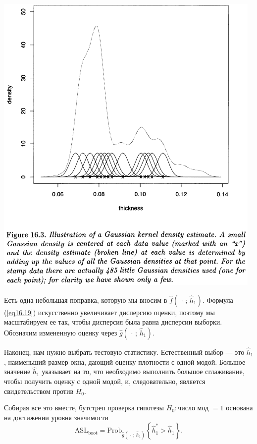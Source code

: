 \newpage
\noindent
\includegraphics[width=\linewidth]{16/f16.3.png}

Есть одна небольшая поправка, которую мы вносим в $\hat{f}(\,\cdot\,;\, \hat{h}_1)$. Формула (\ref{eq16.19}) искусственно увеличивает дисперсию оценки, поэтому мы масштабируем ее так, чтобы дисперсия была равна дисперсии выборки. Обозначим измененную оценку через $\hat{g}(\,\cdot\,;\, \hat{h}_1)$.

Наконец, нам нужно выбрать тестовую статистику. Естественный выбор --- это $ \hat{h}_1$, наименьший размер окна, дающий оценку плотности с одной модой. Большое значение $ \hat{h}_1$ указывает на то, что необходимо выполнить большое сглаживание, чтобы получить оценку с одной модой, и, следовательно, является свидетельством против $H_0$.

Собирая все это вместе, бутстреп проверка гипотезы $H_0: \text{число мод } = 1$ основана на достижении уровня значимости
\begin{equation}\label{eq16.21}
    \text{ASL}_{\text{boot}} = \text{Prob}_{\hat{g}(\,\cdot\,;\, \hat{h}_1)}\left\{\hat{h}^{*}_1 > \hat{h}_1\right\}.
\end{equation}

